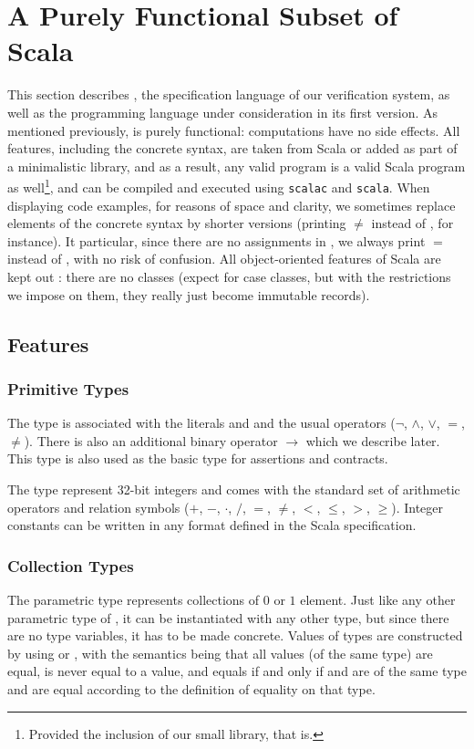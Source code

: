 \section{A Purely Functional Subset of Scala}
This section describes \purescala, the specification language of our
verification system, as well as the programming language under consideration
in its first version. As mentioned previously, {\purescala} is purely
functional: computations have no side effects. All features, including the
concrete syntax, are taken from Scala or added as part of a minimalistic
library, and as a result, any valid {\purescala} program is a valid Scala
program as well\footnote{Provided the inclusion of our small library, that
is.}, and can be compiled and executed using {\tt scalac} and {\tt scala}.
When displaying code examples, for reasons of space and clarity, we sometimes
replace elements of the concrete syntax by shorter versions (printing $\neq$
instead of \K{!=}, for instance). It particular, since there are no assignments
in {\purescala}, we always print $=$ instead of \K{==}, with no risk of
confusion. All object-oriented features of Scala are kept out {\purescala}:
there are no classes (expect for case classes, but with the restrictions we
impose on them, they really just become immutable records).

\subsection{Features}
\subsubsection{Primitive Types}
The  type is associated with the literals  and 
and the usual operators ($\neg$, $\land$, $\lor$, $=$, $\neq$). There is also
an additional binary operator $\rightarrow$ which we describe later. This
type is also used as the basic type for assertions and contracts.

The  type represent 32-bit integers and comes with the standard set of
arithmetic operators and relation symbols ($+$, $-$, $\cdot$, $/$, $=$,
$\neq$, $<$, $\leq$, $>$, $\geq$). Integer constants can be written in any
format defined in the Scala specification.

\subsubsection{Collection Types}
The  parametric type represents collections of $0$ or $1$
element. Just like any other parametric type of {\purescala}, it can be
instantiated with any other {\purescala} type, but since there are no type
variables, it has to be made concrete. Values of types  are
constructed by using  or , with the semantics being
that all  values (of the same type) are equal,  is never
equal to a  value, and  equals  if and
only if  and  are of the same type and are equal according
to the definition of equality on that type.

